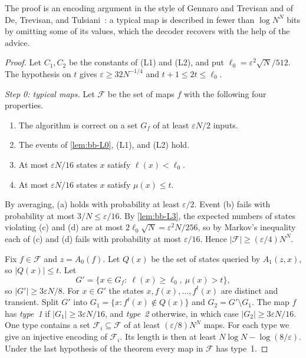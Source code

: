 \documentclass[11pt]{article}
\theoremstyle{definition}
\theoremstyle{remark}
\numberwithin{equation}{section}
\begin{document}
The proof is an encoding argument in the style of Gennaro and Trevisan
and of De, Trevisan, and Tulsiani~\cite{GT00,DTT10}: a typical map is
described in fewer than $\log N^N$ bits by omitting some of its values,
which the decoder recovers with the help of the advice.

\begin{proof}
Let $C_1,C_2$ be the constants of (L1) and (L2), and put
$\ell_0=\varepsilon^2\sqrt N/512$.  The hypothesis on $t$ gives
$\varepsilon\geq32N^{-1/4}$ and $t+1\leq2t\leq\ell_0$.

\emph{Step 0: typical maps.}  Let $\mathcal F$ be the set of maps $f$ with
the following four properties.
\begin{enumerate}[label=(\alph*)]
\item The algorithm is correct on a set $G_f$ of at least $\varepsilon N/2$
  inputs.
\item The events of \cref{lem:bb-L0}, (L1), and (L2) hold.
\item At most $\varepsilon N/16$ states $x$ satisfy $\ell(x)<\ell_0$.
\item At most $\varepsilon N/16$ states $x$ satisfy $\mu(x)\leq t$.
\end{enumerate}
By averaging, (a) holds with probability at least $\varepsilon/2$.  Event
(b) fails with probability at most $3/N\leq\varepsilon/16$.  By
\cref{lem:bb-L3}, the expected numbers of states violating (c) and (d)
are at most $2\ell_0\sqrt N=\varepsilon^2N/256$, so by Markov's inequality
each of (c) and (d) fails with probability at most $\varepsilon/16$.
Hence $|\mathcal F|\geq(\varepsilon/4)N^N$.

Fix $f\in\mathcal F$ and $z=A_0(f)$.  Let $Q(x)$ be the set of states
queried by $A_1(z,x)$, so $|Q(x)|\leq t$.  Let
\[
  G'=\{x\in G_f:\ \ell(x)\geq\ell_0,\ \mu(x)>t\},
\]
so $|G'|\geq3\varepsilon N/8$.  For $x\in G'$ the states
$x,f(x),\ldots,f^t(x)$ are distinct and transient.  Split $G'$ into
$G_1=\{x:f^t(x)\notin Q(x)\}$ and $G_2=G'\setminus G_1$.  The map $f$ has
\emph{type~1} if $|G_1|\geq3\varepsilon N/16$, and \emph{type~2}
otherwise, in which case $|G_2|\geq3\varepsilon N/16$.  One type contains
a set $\mathcal F_i\subseteq\mathcal F$ of at least $(\varepsilon/8)N^N$
maps.  For each type we give an injective encoding of $\mathcal F_i$.  Its
length is then at least $N\log N-\log(8/\varepsilon)$.  Under the last
hypothesis of the theorem every map in $\mathcal F$ has type~1.


\end{proof}
\end{document}

